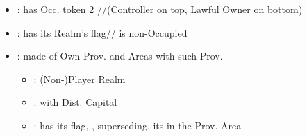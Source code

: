 \documentclass[10pt]{article}
\begin{document}
\begin{itemize}
	\item {}: has Occ. token  2 \rebel/\town/\vassal (Controller on top, Lawful Owner on bottom)
	\item {}: has its Realm's flag/\town/\dnpr {} is non-Occupied
	\item {}: made of Own Prov. and Areas with such Prov.
	\begin{itemize}
		\item {}: (Non-)Player Realm
		\item {}: with Dist. Capital
		\item {}: has its flag, , superseding, its \core in the Prov. Area
	\end{itemize}
\end{itemize}
\end{document}
